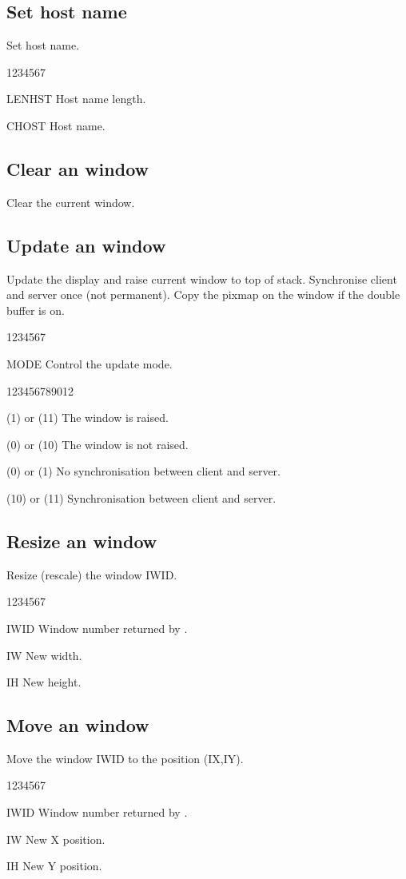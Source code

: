 \subsection{Set  host name}
%
\Action
Set host name.
\Pdesc
\begin{DLtt}{1234567}
\item[LENHST] Host name length.
\item[CHOST] Host name.
\end{DLtt}
%
\subsection{Clear an  window}
\Action
Clear the current window.
%
\subsection{Update an  window}
\Action
Update the display and raise current window to top of stack.
Synchronise client and server once (not permanent).
Copy the pixmap on the window if the double buffer is on.
\begin{DLtt}{1234567}
\item[MODE] Control the update mode.
\begin{DLtt}{123456789012}
\item[(1) or (11)] The window is raised.
\item[(0) or (10)] The window is not raised.
\item[(0) or (1)]  No synchronisation between client and server.
\item[(10) or (11)] Synchronisation between client and server.
\end{DLtt}
\end{DLtt}
%
\subsection{Resize an  window}
\Action
Resize (rescale) the  window IWID.
\Pdesc
\begin{DLtt}{1234567}
\item[IWID] Window number returned by .
\item[IW] New width.
\item[IH] New height.
\end{DLtt}
%
\subsection{Move an  window}
\Action
Move the  window IWID to the position (IX,IY).
\Pdesc
\begin{DLtt}{1234567}
\item[IWID] Window number returned by .
\item[IW] New X position.
\item[IH] New Y position.
\end{DLtt}



